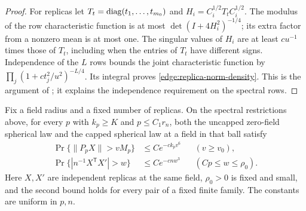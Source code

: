 \begin{proof}
For replicas let \(T_t=\operatorname{diag}(t_1,\ldots,t_{m_0})\) and
\(H_i=C_i^{1/2}T_tC_i^{1/2}\).  The modulus of the row characteristic
function is at most \(\det(I+4H_i^2)^{-1/4}\); its extra factor from a
nonzero mean is at most one.  The singular values of \(H_i\) are at
least \(cu^{-1}\) times those of \(T_t\), including when the entries of
\(T_t\) have different signs.  Independence of the \(L\) rows bounds
the joint characteristic function by
\(\prod_j(1+ct_j^2/u^2)^{-L/4}\).  Its integral proves
\eqref{edge:replica-norm-density}.  This is the argument of
\cite[Section~15.3, Equation~(15.6)]{CM};
it explains the independence requirement on the spectral rows.
\end{proof}

\begin{lemma}
\label{edge:spherical-tails}
Fix a field radius and a fixed number of replicas.  On the spectral
restrictions above, for every \(p\) with \(k_p\ge K\) and \(p\le C_1r_n\),
both the uncapped zero-field spherical law and the capped spherical law
at a field in that ball satisfy
\begin{equation}\label{edge:spherical-tail-bounds}
 \begin{aligned}
 \Pr\{\|P_pX\|>vM_p\}&\le C e^{-c k_pv^6}
       &&(v\ge v_0),\\
 \Pr\{|n^{-1}X^{\mathsf T}X'|>w\}&\le C e^{-c n w^3}
       &&(Cp\le w\le\rho_0).
 \end{aligned}
\end{equation}
Here \(X,X'\) are independent replicas at the same field,
\(\rho_0>0\) is fixed and small, and the second bound holds for every
pair of a fixed finite family.  The constants are uniform in \(p,n\).
\end{lemma}

